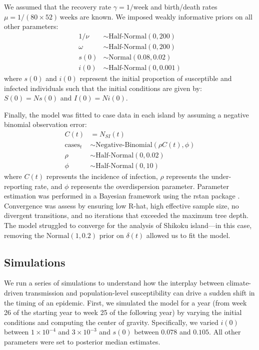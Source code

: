 \documentclass[12pt]{article}
\begin{document}
We assumed that the recovery rate $\gamma = 1/\mathrm{week}$ and birth/death rates $\mu = 1/(80\times 52)\,\mathrm{weeks}$ are known.
We imposed weakly informative priors on all other parameters:
\begin{align}
1/\nu &\sim \textrm{Half-Normal}(0, 200)\\
\omega &\sim \textrm{Half-Normal}(0, 200)\\
s(0) &\sim \textrm{Normal}(0.08, 0.02)\\
i(0) &\sim \textrm{Half-Normal}(0, 0.001)
\end{align}
where $s(0)$ and $i(0)$ represent the initial proportion of susceptible and infected individuals such that the initial conditions are given by: $S(0) = Ns(0)$ and $I(0) = N i(0)$.

Finally, the model was fitted to case data in each island by assuming a negative binomial observation error:
\begin{align}
C(t) &= N_{SI}(t)\\
\textrm{cases}_t &\sim \textrm{Negative-Binomial}(\rho C(t), \phi)\\
\rho &\sim \textrm{Half-Normal}(0, 0.02)\\
\phi &\sim \textrm{Half-Normal}(0, 10)
\end{align}
where $C(t)$ represents the incidence of infection, $\rho$ represents the under-reporting rate, and $\phi$ represents the overdispersion parameter.
Parameter estimation was performed in a Bayesian framework using the rstan package \citep{carpenter2017stan}.
Convergence was assess by ensuring low R-hat, high effective sample size, no divergent transitions, and no iterations that exceeded the maximum tree depth.
The model struggled to converge for the analysis of Shikoku island---in this case, removing the $\mathrm{Normal}(1, 0.2)$ prior on $\delta(t)$ allowed us to fit the model.

\subsection*{Simulations}

We run a series of simulations to understand how the interplay between climate-driven transmission and population-level susceptibility can drive a sudden shift in the timing of an epidemic.
First, we simulated the model for a year (from week 26 of the starting year to week 25 of the following year) by varying the initial conditions and computing the center of gravity.
Specifically, we varied $i(0)$ between $1\times 10^{-4}$ and $3\times 10^{-3}$ and $s(0)$ between $0.078$ and $0.105$.
All other parameters were set to posterior median estimates.
\end{document}
